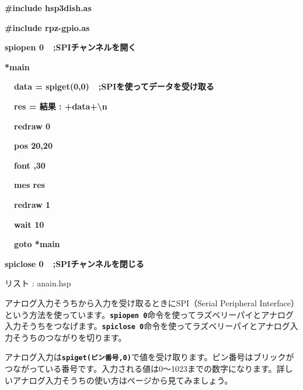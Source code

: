 \documentclass[a4paper,dvipdfmx]{jarticle}
\newcounter{List}
\renewcommand\theList{\arabic{List}}
\begin{document}
\centering
\begin{minipage}{17.006cm}
{\ttfamily\bfseries
\#include {\textquotedbl}hsp3dish.as{\textquotedbl}}

{\ttfamily\bfseries
\#include {\textquotedbl}rpz-gpio.as{\textquotedbl}}


\bigskip

{\ttfamily\bfseries
spiopen 0\ \ \textcolor[rgb]{0.0,0.0,0.6}{;SPIチャンネルを開く}}


\bigskip

{\ttfamily\bfseries
*main}

{\ttfamily\bfseries
\ \ data =
spiget(0,0)\ \ \textcolor[rgb]{0.0,0.0,0.6}{;SPIを使ってデータを受け取る}}

{\ttfamily\bfseries
\ \ res = {\textquotedbl}結果 : {\textquotedbl}+data+{\textquotedbl}{\textbackslash}n{\textquotedbl}}


\bigskip

{\ttfamily\bfseries
\ \ redraw 0}

{\ttfamily\bfseries
\ \ pos 20,20}

{\ttfamily\bfseries
\ \ font {\textquotedbl}{\textquotedbl},30}

{\ttfamily\bfseries
\ \ mes res}

{\ttfamily\bfseries
\ \ redraw 1}


\bigskip

{\ttfamily\bfseries
\ \ wait 10}

{\ttfamily\bfseries
\ \ goto *main}


\bigskip

{\ttfamily\bfseries
spiclose 0\ \ \textcolor[rgb]{0.0,0.0,0.6}{;SPIチャンネルを閉じる}}

{\mdseries
リスト \stepcounter{List}{\theList}: anain.hsp}
\end{minipage}

\bigskip

\clearpage
アナログ入力そうちから入力を受け取るときにSPI（Serial
Peripheral
Interface）という方法を使っています。\texttt{\textbf{spiopen
0}}命令を使ってラズベリーパイとアナログ入力そうちをつなげます。\texttt{\textbf{spiclose
0}}命令を使ってラズベリーパイとアナログ入力そうちのつながりを切ります。

アナログ入力は\texttt{\textbf{spiget(ピン番号,0)}}で値を受け取ります。ピン番号はブリックがつながっている番号です。入力される値は0〜1023までの数字になります。詳しいアナログ入力そうちの使い方は\pageref{bkm:RefHeadingToc4569508239293}ページから見てみましょう。
\end{document}
